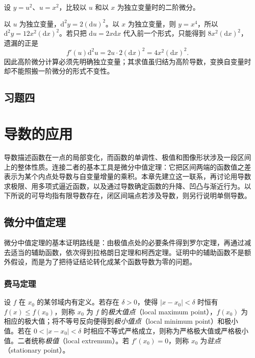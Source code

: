 \documentclass[UTF8,12pt,a4paper,fontset=fandol]{ctexbook}
\begin{document}
\begin{example}
\label{ex:failure-of-invariance-second-differential}
设 $y=u^2$、$u=x^2$，比较以 $u$ 和以 $x$ 为独立变量时的二阶微分。
\end{example}
\begin{solve}
以 $u$ 为独立变量，$\mathrm d^2y=2(\mathrm du)^2$。以 $x$ 为独立变量，则 $y=x^4$，所以 $\mathrm d^2y=12x^2(\mathrm dx)^2$。若只把 $\mathrm du=2x\mathrm dx$ 代入前一个形式，只能得到 $8x^2(\mathrm dx)^2$，遗漏的正是
\[
    f'(u)\mathrm d^2u=2u\cdot2(\mathrm dx)^2
    =4x^2(\mathrm dx)^2.
\]
因此高阶微分计算必须先明确独立变量；其求值虽归结为高阶导数，变换自变量时却不能照搬一阶微分的形式不变性。
\end{solve}

\section*{习题四}

\chapter{导数的应用}
\label{chap:applications-of-derivatives}

导数描述函数在一点的局部变化，而函数的单调性、极值和图像形状涉及一段区间上的整体性质。连接二者的基本工具是微分中值定理：它把区间两端的函数值之差表示为某个内点处导数与自变量增量的乘积。本章先建立这一联系，再讨论用导数求极限、用多项式逼近函数，以及通过导数确定函数的升降、凹凸与渐近行为。以下所说的可导均指有限导数存在，闭区间端点若涉及导数，则另行说明单侧导数。

\section{微分中值定理}
\label{sec:differential-mean-value-theorems}

微分中值定理的基本证明路线是：由极值点处的必要条件得到罗尔定理，再通过减去适当的辅助函数，依次得到拉格朗日定理和柯西定理。证明中的辅助函数不是额外假设，而是为了把待证结论转化成某个函数导数为零的问题。

\subsection{费马定理}
\label{subsec:fermat-theorem}

\begin{definition}
\label{def:local-extrema-and-stationary-points}
设 $f$ 在 $x_0$ 的某邻域内有定义。若存在 $\delta>0$，使得 $|x-x_0|<\delta$ 时恒有 $f(x)\leq f(x_0)$，则称 $x_0$ 为 $f$ 的\emph{极大值点}（local maximum point），$f(x_0)$ 为相应的极大值；将不等号反向便得到\emph{极小值点}（local minimum point）和极小值。若在 $0<|x-x_0|<\delta$ 时相应不等式严格成立，则称为严格极大值或严格极小值。二者统称\emph{极值}（local extremum）。若 $f'(x_0)=0$，则称 $x_0$ 为\emph{驻点}（stationary point）。
\end{definition}
\end{document}
